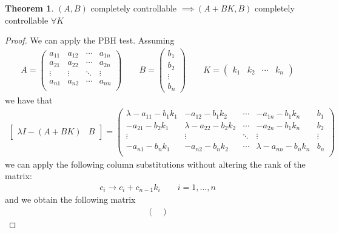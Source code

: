 \documentclass{book}
\theoremstyle{definition}
\newtheorem{theorem}{Theorem}[section]
\theoremstyle{remark}
\theoremstyle{remark}
\begin{document}
\begin{theorem}
    $(A,B)$ completely controllable $\implies (A+BK,B)$ completely controllable $\forall K$
\end{theorem}
\begin{proof}
    We can apply the PBH test. Assuming
    \begin{gather*}
        A=\begin{pmatrix}
            a_{11} & a_{12}& \cdots & a_{1n}\\
            a_{21} & a_{22}& \cdots & a_{2n}\\
            \vdots & \vdots& \ddots & \vdots\\
            a_{n1} & a_{n2}& \cdots & a_{nn}\\
        \end{pmatrix}\qquad B=\begin{pmatrix}
            b_1 \\ b_2 \\ \vdots \\ b_n
        \end{pmatrix} \qquad K=\begin{pmatrix}
            k_1 & k_2 & \cdots & k_n
        \end{pmatrix}
    \end{gather*}
    we have that
    \begin{gather*}
        \begin{bmatrix}
            \lambda I -(A+BK) & B
        \end{bmatrix}=\begin{pmatrix}
            \lambda-a_{11}-b_1k_1 & -a_{12}-b_1k_2& \cdots & -a_{1n}-b_1k_n & b_1\\
            -a_{21}-b_2k_1 & \lambda-a_{22}-b_2k_2& \cdots & -a_{2n}-b_1k_n & b_2\\
            \vdots & \vdots & \ddots & \vdots & \vdots\\
            -a_{n1}-b_nk_1 & -a_{n2}-b_nk_2& \cdots & \lambda-a_{nn}-b_nk_n & b_n\\
        \end{pmatrix}
    \end{gather*}
    we can apply the following column substitutions without altering the rank of the matrix:
    \begin{gather*}
        c_i\rightarrow c_i+c_{n-1}k_i \qquad i=1,\dots,n
    \end{gather*}
    and we obtain the following matrix
    \begin{gather*}
        \begin{pmatrix}

\end{pmatrix}
\end{gather*}
\end{proof}
\end{document}
